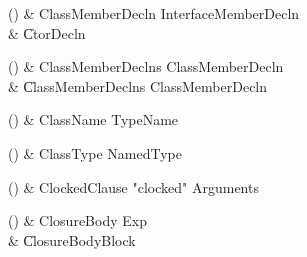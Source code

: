 \begin{bbgrammarappendix}{3.4in}

() & ClassMemberDecln \label{prod:ClassMemberDecln}  \: InterfaceMemberDecln  \\

 &    \| CtorDecln \\

\end{bbgrammarappendix}

\begin{bbgrammarappendix}{3.3in}

() & ClassMemberDeclns \label{prod:ClassMemberDeclns}  \: ClassMemberDecln  \\

 &    \| ClassMemberDeclns ClassMemberDecln \\

\end{bbgrammarappendix}

\begin{bbgrammarappendix}{4.1in}

() & ClassName \label{prod:ClassName}  \: TypeName  \\


\end{bbgrammarappendix}

\begin{bbgrammarappendix}{4.1in}

() & ClassType \label{prod:ClassType}  \: NamedType  \\


\end{bbgrammarappendix}

\begin{bbgrammarappendix}{3.7in}

() & ClockedClause \label{prod:ClockedClause}  \: \xcd"clocked" Arguments  \\


\end{bbgrammarappendix}

\begin{bbgrammarappendix}{3.9in}

() & ClosureBody \label{prod:ClosureBody}  \: Exp  \\

 &    \| ClosureBodyBlock \\

\end{bbgrammarappendix}

